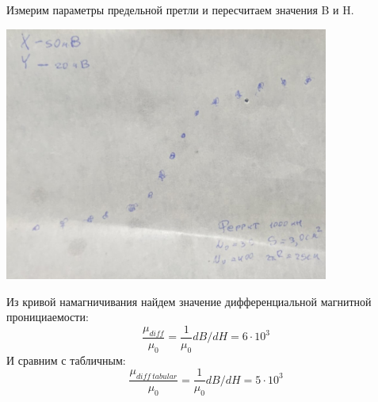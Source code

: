 \documentclass[12pt]{article}
\begin{document}
Измерим параметры предельной претли и пересчитаем значения B и H. \\

\begin{minipage}{0.5\textwidth}
\begin{center}
    \includegraphics[width=0.8\textwidth]{fer.jpg}
    \label{fer}
\end{center}
\end{minipage}
\begin{minipage}{0.5\textwidth}
Из кривой намагничивания найдем значение дифференциальной магнитной пронициаемости:
    \begin{equation*}
        \frac{\mu_{diff}}{\mu_0} = \frac{1}{\mu_0}dB/dH = 6 \cdot 10^3
    \end{equation*}
И сравним с табличным:
    \begin{equation*}
        \frac{\mu_{diff \: tabular}}{\mu_0} = \frac{1}{\mu_0}dB/dH = 5 \cdot 10^3
    \end{equation*}
\end{minipage}
\end{document}
